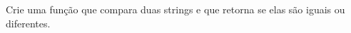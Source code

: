 
\question[10]

Crie uma função que compara duas strings e que retorna se elas são iguais ou diferentes.